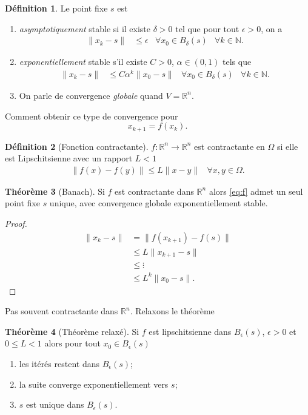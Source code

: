 \documentclass[11pt,a4paper]{article}
\newcommand{\R}{\mathbb{R}}
\newcommand{\Rn}{\R^n}
\theoremstyle{definition}
\newtheorem{mydef}{Définition}
\newtheorem{mytheo}[mydef]{Théorème}
\begin{document}
\begin{mydef}
  Le point fixe $s$ est
  \begin{enumerate}
    \item \emph{asymptotiquement} stable si il existe $\delta > 0$ tel que
      pour tout $\epsilon > 0$, on a
      \begin{align*}
        \|x_k - s\| & \leq \epsilon &
        \forall x_0 \in B_\delta(s) & \forall k \in \mathbb{N}.
      \end{align*}
    \item \emph{exponentiellement} stable s'il existe $C > 0$,
      $\alpha \in (0,1)$ tels que
      \begin{align*}
        \|x_k-s\| & \leq C\alpha^k\|x_0-s\| &
        \forall x_0 \in B_\delta(s) & \forall k \in \mathbb{N}.
      \end{align*}
    \item On parle de convergence \emph{globale} quand $V = \Rn$.
  \end{enumerate}
\end{mydef}

Comment obtenir ce type de convergence pour
\begin{equation}
  \label{eq:f}
  x_{k+1} = f(x_k).
\end{equation}

\begin{mydef}[Fonction contractante]
  $f:\Rn\to\Rn$ est contractante en $\Omega$
  si elle est Lipschitsienne avec un
  rapport $L < 1$
  \begin{align*}
    \|f(x) - f(y)\| \leq L\|x-y\| & \forall x,y \in \Omega.
  \end{align*}
\end{mydef}

\begin{mytheo}[Banach]
  Si $f$ est contractante dans $\Rn$ alors \ref{eq:f}
  admet un seul point fixe $s$ unique,
  avec convergence globale exponentiellement stable.
  \begin{proof}
    \begin{align*}
      \|x_k - s\| & = \|f(x_{k+1}) - f(s)\|\\
      & \leq L\|x_{k+1}-s\|\\
      & \leq \vdots\\
      & \leq L^k\|x_0-s\|.
    \end{align*}
  \end{proof}
\end{mytheo}

Pas souvent contractante dans $\Rn$.
Relaxons le théorème
\begin{mytheo}[Théorème relaxé]
  \label{theo:relax}
  Si $f$ est lipschitsienne dans $B_\epsilon(s)$,
  $\epsilon > 0$ et $0 \leq L < 1$ alors pour tout $x_0 \in B_\epsilon(s)$
  \begin{enumerate}
    \item les itérés restent dans $B_\epsilon(s)$;
    \item la suite converge exponentiellement vers $s$;
    \item $s$ est unique dans $B_\epsilon(s)$.
  \end{enumerate}
\end{mytheo}
\end{document}
